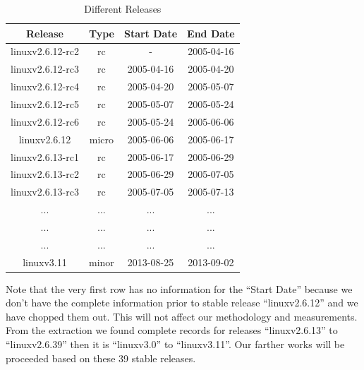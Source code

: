 \documentclass{acm_proc_article-sp}
\begin{document}
\begin{table}[ht]
\caption{Different Releases}  	%
\centering 						%
\begin{tabular}{c c c c}				%
\hline\hline						%
Release & Type & Start Date & End Date \\ [0.5ex]
\hline 							%
linuxv2.6.12-rc2 	& rc       	& - & 2005-04-16 \\
linuxv2.6.12-rc3 	& rc       	& 2005-04-16 	& 2005-04-20 \\
linuxv2.6.12-rc4 	& rc       	& 2005-04-20 	& 2005-05-07 \\
linuxv2.6.12-rc5 	& rc       	& 2005-05-07 	& 2005-05-24 \\
linuxv2.6.12-rc6 	& rc       	& 2005-05-24 	& 2005-06-06 \\
linuxv2.6.12     	& micro 		& 2005-06-06 	& 2005-06-17 \\
linuxv2.6.13-rc1 	& rc       	& 2005-06-17 	& 2005-06-29 \\
linuxv2.6.13-rc2 	& rc       	& 2005-06-29 	& 2005-07-05 \\
linuxv2.6.13-rc3 	& rc       	& 2005-07-05 	& 2005-07-13 \\
...			     	& ...	   	& ... 		    & ...\\
...			     	& ...	   	& ... 		    & ... \\
...			     	& ...	   	& ... 		    & ... \\
linuxv3.11          	& minor 	& 2013-08-25 		& 2013-09-02 \\
[1ex]							%
\hline 							%
\end{tabular}
\label{table:nonlin} 			%
\end{table}

Note that the very first row has no information for the ``Start Date'' because we don't have the  complete information prior to stable release ``linuxv2.6.12'' and we have chopped them out. This will not affect our methodology and measurements. From the extraction we found complete records for releases ``linuxv2.6.13'' to ``linuxv2.6.39'' then it is ``linuxv3.0'' to ``linuxv3.11''. Our farther works will be proceeded based on these 39 stable releases.
\end{document}
